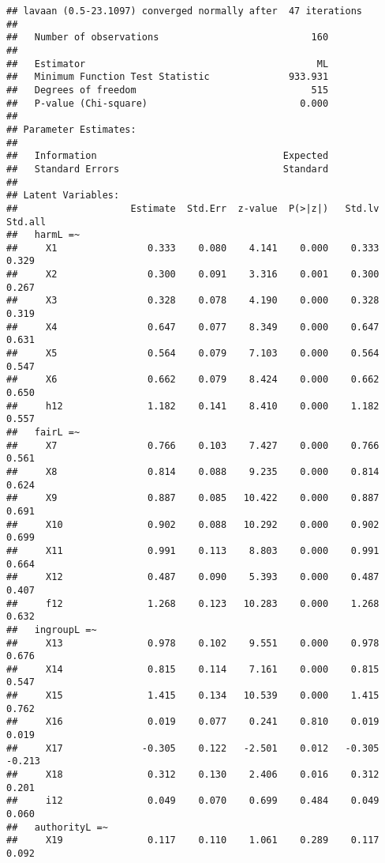 \documentclass[english,man]{apa6}
\newcounter{author}
\theoremstyle{definition}
\theoremstyle{definition}
\theoremstyle{definition}
\theoremstyle{remark}
\begin{document}
\begin{verbatim}
## lavaan (0.5-23.1097) converged normally after  47 iterations
## 
##   Number of observations                           160
## 
##   Estimator                                         ML
##   Minimum Function Test Statistic              933.931
##   Degrees of freedom                               515
##   P-value (Chi-square)                           0.000
## 
## Parameter Estimates:
## 
##   Information                                 Expected
##   Standard Errors                             Standard
## 
## Latent Variables:
##                    Estimate  Std.Err  z-value  P(>|z|)   Std.lv  Std.all
##   harmL =~                                                              
##     X1                0.333    0.080    4.141    0.000    0.333    0.329
##     X2                0.300    0.091    3.316    0.001    0.300    0.267
##     X3                0.328    0.078    4.190    0.000    0.328    0.319
##     X4                0.647    0.077    8.349    0.000    0.647    0.631
##     X5                0.564    0.079    7.103    0.000    0.564    0.547
##     X6                0.662    0.079    8.424    0.000    0.662    0.650
##     h12               1.182    0.141    8.410    0.000    1.182    0.557
##   fairL =~                                                              
##     X7                0.766    0.103    7.427    0.000    0.766    0.561
##     X8                0.814    0.088    9.235    0.000    0.814    0.624
##     X9                0.887    0.085   10.422    0.000    0.887    0.691
##     X10               0.902    0.088   10.292    0.000    0.902    0.699
##     X11               0.991    0.113    8.803    0.000    0.991    0.664
##     X12               0.487    0.090    5.393    0.000    0.487    0.407
##     f12               1.268    0.123   10.283    0.000    1.268    0.632
##   ingroupL =~                                                           
##     X13               0.978    0.102    9.551    0.000    0.978    0.676
##     X14               0.815    0.114    7.161    0.000    0.815    0.547
##     X15               1.415    0.134   10.539    0.000    1.415    0.762
##     X16               0.019    0.077    0.241    0.810    0.019    0.019
##     X17              -0.305    0.122   -2.501    0.012   -0.305   -0.213
##     X18               0.312    0.130    2.406    0.016    0.312    0.201
##     i12               0.049    0.070    0.699    0.484    0.049    0.060
##   authorityL =~                                                         
##     X19               0.117    0.110    1.061    0.289    0.117    0.092

\end{verbatim}
\end{document}
